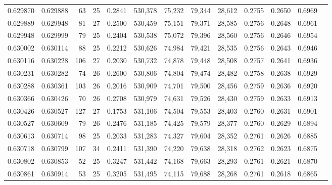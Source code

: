 \begin{tabular}{rrrrrrrrrrrrr}
0.629870 & 0.629888 &  63 &  25 &                                     0.2841 & 530,378 &  75,232 &  79,344 &  28,612 & 0.2755 & 0.2650 & 0.6969 \\
0.629889 & 0.629948 &  81 &  27 &                                     0.2500 & 530,459 &  75,151 &  79,371 &  28,585 & 0.2756 & 0.2648 & 0.6961 \\
0.629948 & 0.629999 &  79 &  25 &                                     0.2404 & 530,538 &  75,072 &  79,396 &  28,560 & 0.2756 & 0.2646 & 0.6954 \\
0.630002 & 0.630114 &  88 &  25 &                                     0.2212 & 530,626 &  74,984 &  79,421 &  28,535 & 0.2756 & 0.2643 & 0.6946 \\
0.630116 & 0.630228 & 106 &  27 &                                     0.2030 & 530,732 &  74,878 &  79,448 &  28,508 & 0.2757 & 0.2641 & 0.6936 \\
0.630231 & 0.630282 &  74 &  26 &                                     0.2600 & 530,806 &  74,804 &  79,474 &  28,482 & 0.2758 & 0.2638 & 0.6929 \\
0.630288 & 0.630361 & 103 &  26 &                                     0.2016 & 530,909 &  74,701 &  79,500 &  28,456 & 0.2759 & 0.2636 & 0.6920 \\
0.630366 & 0.630426 &  70 &  26 &                                     0.2708 & 530,979 &  74,631 &  79,526 &  28,430 & 0.2759 & 0.2633 & 0.6913 \\
0.630426 & 0.630527 & 127 &  27 &                                     0.1753 & 531,106 &  74,504 &  79,553 &  28,403 & 0.2760 & 0.2631 & 0.6901 \\
0.630527 & 0.630609 &  79 &  26 &                                     0.2476 & 531,185 &  74,425 &  79,579 &  28,377 & 0.2760 & 0.2629 & 0.6894 \\
0.630613 & 0.630714 &  98 &  25 &                                     0.2033 & 531,283 &  74,327 &  79,604 &  28,352 & 0.2761 & 0.2626 & 0.6885 \\
0.630718 & 0.630799 & 107 &  34 &                                     0.2411 & 531,390 &  74,220 &  79,638 &  28,318 & 0.2762 & 0.2623 & 0.6875 \\
0.630802 & 0.630853 &  52 &  25 &                                     0.3247 & 531,442 &  74,168 &  79,663 &  28,293 & 0.2761 & 0.2621 & 0.6870 \\
0.630861 & 0.630914 &  53 &  25 &                                     0.3205 & 531,495 &  74,115 &  79,688 &  28,268 & 0.2761 & 0.2618 & 0.6865 \\

\end{tabular}
